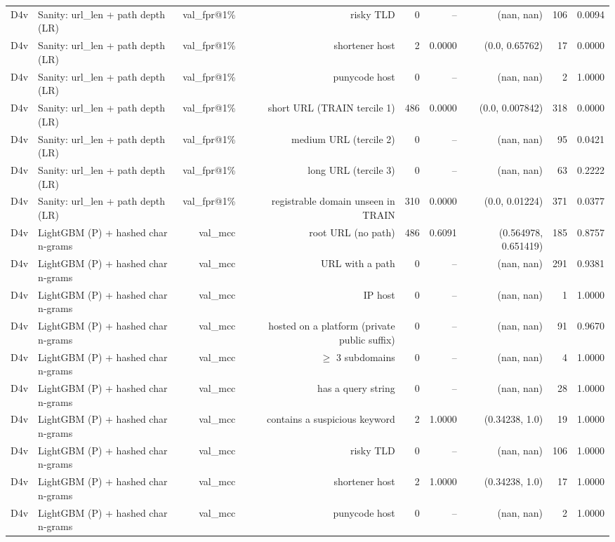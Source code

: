 \begin{table}[t]
\begin{tabular}{llrrrrrrr}
D4v & Sanity: url\_len + path depth (LR) & val\_fpr@1\% & risky TLD & 0 & -- & (nan, nan) & 106 & 0.0094 \\
D4v & Sanity: url\_len + path depth (LR) & val\_fpr@1\% & shortener host & 2 & 0.0000 & (0.0, 0.65762) & 17 & 0.0000 \\
D4v & Sanity: url\_len + path depth (LR) & val\_fpr@1\% & punycode host & 0 & -- & (nan, nan) & 2 & 1.0000 \\
D4v & Sanity: url\_len + path depth (LR) & val\_fpr@1\% & short URL (TRAIN tercile 1) & 486 & 0.0000 & (0.0, 0.007842) & 318 & 0.0000 \\
D4v & Sanity: url\_len + path depth (LR) & val\_fpr@1\% & medium URL (tercile 2) & 0 & -- & (nan, nan) & 95 & 0.0421 \\
D4v & Sanity: url\_len + path depth (LR) & val\_fpr@1\% & long URL (tercile 3) & 0 & -- & (nan, nan) & 63 & 0.2222 \\
D4v & Sanity: url\_len + path depth (LR) & val\_fpr@1\% & registrable domain unseen in TRAIN & 310 & 0.0000 & (0.0, 0.01224) & 371 & 0.0377 \\
D4v & LightGBM (P) + hashed char n-grams & val\_mcc & root URL (no path) & 486 & 0.6091 & (0.564978, 0.651419) & 185 & 0.8757 \\
D4v & LightGBM (P) + hashed char n-grams & val\_mcc & URL with a path & 0 & -- & (nan, nan) & 291 & 0.9381 \\
D4v & LightGBM (P) + hashed char n-grams & val\_mcc & IP host & 0 & -- & (nan, nan) & 1 & 1.0000 \\
D4v & LightGBM (P) + hashed char n-grams & val\_mcc & hosted on a platform (private public suffix) & 0 & -- & (nan, nan) & 91 & 0.9670 \\
D4v & LightGBM (P) + hashed char n-grams & val\_mcc & $\geq$ 3 subdomains & 0 & -- & (nan, nan) & 4 & 1.0000 \\
D4v & LightGBM (P) + hashed char n-grams & val\_mcc & has a query string & 0 & -- & (nan, nan) & 28 & 1.0000 \\
D4v & LightGBM (P) + hashed char n-grams & val\_mcc & contains a suspicious keyword & 2 & 1.0000 & (0.34238, 1.0) & 19 & 1.0000 \\
D4v & LightGBM (P) + hashed char n-grams & val\_mcc & risky TLD & 0 & -- & (nan, nan) & 106 & 1.0000 \\
D4v & LightGBM (P) + hashed char n-grams & val\_mcc & shortener host & 2 & 1.0000 & (0.34238, 1.0) & 17 & 1.0000 \\
D4v & LightGBM (P) + hashed char n-grams & val\_mcc & punycode host & 0 & -- & (nan, nan) & 2 & 1.0000 \\

\end{tabular}
\end{table}
